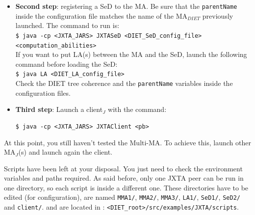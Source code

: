 \begin{itemize}
\item{\textbf{Second step}: registering a SeD to the MA. Be sure that
    the \texttt{parentName} inside the configuration file matches the
    name of the MA$_{DIET}$ previously launched. The command to run is:\\
    {\footnotesize \texttt{\$ java -cp <JXTA\_JARS> JXTASeD
        <DIET\_SeD\_config\_file> <computation\_abilities>}
    }\\
    If you want to put LA(s) between the MA and the
    SeD, launch the following command before loading the SeD:\\
    {\footnotesize
      \texttt{\$ java LA <DIET\_LA\_config\_file>}
    }\\ Check the DIET tree coherence and the \texttt{parentName}
    variables inside the configuration files. }
\item{\textbf{Third step}: Launch a client$_{J}$ with the command:\\
    {\footnotesize
      \texttt{\$ java -cp <JXTA\_JARS> JXTAClient <pb>}

   }
 }

  \end{itemize}
  

At this point, you still haven't tested the Multi-MA. To achieve this,
launch other MA$_{J}$(s) and launch again the client.

Scripts have been left at your disposal. You just need to check the
environment variables and paths required. As said before, only one
JXTA peer can be run in one directory, so each script is inside a
different one. These directories have to be edited (for
configuration), are named \texttt{MMA1/}, \texttt{MMA2/},
\texttt{MMA3/}, \texttt{LA1/}, \texttt{SeD1/}, \texttt{SeD2/} and
\texttt{client/}.  and are located in :
\texttt{<DIET\_root>/src/examples/JXTA/scripts}.



